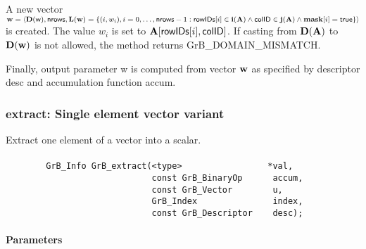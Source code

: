 A new vector ${\bf w} = \langle \bold{D}({\sf w}),{\sf nrows},
\bold{L}({\bf w}) = \{ (i,w_{i}), i = 0,\ldots,{\sf nrows}-1 : {\sf rowIDs}[i]
\in \bold{i}({\bf A}) \wedge {\sf colID} \in \bold{j}({\bf A}) \wedge {\bf mask}[i] = {\sf true} \} \rangle$
is created.  The value $w_{i}$ is set to ${\bf A}[{\sf rowIDs}[i],{\sf colID}]$. If
casting from $\bold{D}({\bf A})$ to $\bold{D}({\bf w})$ is not
allowed, the method returns {\sf GrB\_DOMAIN\_MISMATCH}.

Finally, output parameter {\sf w} is computed from vector ${\bf w}$ as
specified by descriptor {\sf desc} and accumulation function {\sf accum}.

\subsubsection{{\sf extract}: Single element vector variant}
\label{Sec:extract_single_element_vec}


Extract one element of a vector into a scalar. 

\paragraph{\syntax}

\begin{verbatim}
        GrB_Info GrB_extract(<type>                 *val,
                             const GrB_BinaryOp      accum,
                             const GrB_Vector        u,
                             GrB_Index               index,
                             const GrB_Descriptor    desc); 
\end{verbatim}

\paragraph{Parameters}

